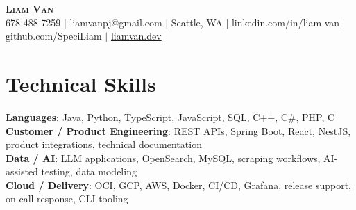 \documentclass[letterpaper,11pt]{article}
\begin{document}

%
\begin{center}
    \textbf{\Huge \scshape Liam Van} \\ \vspace{1pt}
    \small 678-488-7259 $|$ \small {liamvanpj@gmail.com} $|$ Seattle, WA
 {{$|$ linkedin.com/in/liam-van} {$|$ github.com/SpeciLiam} {$|$ \href{https://liamvan.dev}{liamvan.dev}}}

\end{center}

\section{Technical Skills}
 \begin{itemize}[leftmargin=0.15in, label={}]
    \small{\item{
     \textbf{Languages}{: Java, Python, TypeScript, JavaScript, SQL, C++, C\#, PHP, C} \\
     \textbf{Customer / Product Engineering}{: REST APIs, Spring Boot, React, NestJS, product integrations, technical documentation} \\
     \textbf{Data / AI}{: LLM applications, OpenSearch, MySQL, scraping workflows, AI-assisted testing, data modeling} \\
     \textbf{Cloud / Delivery}{: OCI, GCP, AWS, Docker, CI/CD, Grafana, release support, on-call response, CLI tooling} \\
    }}
 \end{itemize}
%

\end{document}
